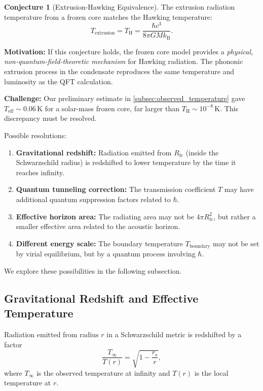 \documentclass[12pt,a4paper]{article}
\newcommand{\Rfc}{R_\text{fc}}
\newcommand{\TH}{T_\text{H}}
\theoremstyle{definition}
\newtheorem{conjecture}{Conjecture}
\begin{document}
\begin{conjecture}[Extrusion-Hawking Equivalence]
The extrusion radiation temperature from a frozen core matches the Hawking temperature:
\begin{equation}
T_\text{extrusion} = \TH = \frac{\hbar c^3}{8\pi G M k_\text{B}}.
\label{eq:extrusion_hawking_match}
\end{equation}
\end{conjecture}

\textbf{Motivation:} If this conjecture holds, the frozen core model provides a \emph{physical, non-quantum-field-theoretic mechanism} for Hawking radiation. The phononic extrusion process in the condensate reproduces the same temperature and luminosity as the QFT calculation.

\textbf{Challenge:} Our preliminary estimate in \cref{subsec:observed_temperature} gave $T_\text{eff} \sim 0.06\,\text{K}$ for a solar-mass frozen core, far larger than $\TH \sim 10^{-8}\,\text{K}$. This discrepancy must be resolved.

Possible resolutions:
\begin{enumerate}
  \item \textbf{Gravitational redshift:} Radiation emitted from $\Rfc$ (inside the Schwarzschild radius) is redshifted to lower temperature by the time it reaches infinity.
  \item \textbf{Quantum tunneling correction:} The transmission coefficient $T$ may have additional quantum suppression factors related to $\hbar$.
  \item \textbf{Effective horizon area:} The radiating area may not be $4\pi \Rfc^2$, but rather a smaller effective area related to the acoustic horizon.
  \item \textbf{Different energy scale:} The boundary temperature $T_\text{boundary}$ may not be set by virial equilibrium, but by a quantum process involving $\hbar$.
\end{enumerate}

We explore these possibilities in the following subsection.

\subsection{Gravitational Redshift and Effective Temperature}
\label{subsec:redshift_correction}

Radiation emitted from radius $r$ in a Schwarzschild metric is redshifted by a factor
\begin{equation}
\frac{T_\infty}{T(r)} = \sqrt{1 - \frac{r_\text{s}}{r}},
\label{eq:redshift_factor}
\end{equation}
where $T_\infty$ is the observed temperature at infinity and $T(r)$ is the local temperature at $r$.
\end{document}
